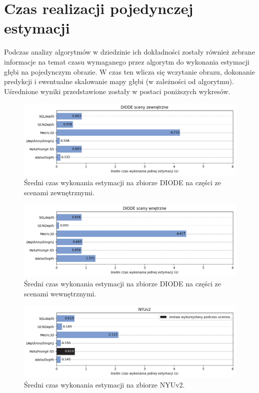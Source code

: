 \section{Czas realizacji pojedynczej estymacji}
Podczas analizy algorytmów w dziedzinie ich dokładności zostały również zebrane informacje na temat czasu wymaganego przez algorytm do wykonania estymacji głębi na pojedynczym obrazie. W czas ten wlicza się wczytanie obrazu, dokonanie predykcji i ewentualne skalowanie mapy głębi (w zależności od algorytmu). Uśrednione wyniki przedstawione zostały w postaci poniższych wykresów.
\begin{figure}[H]
    \centering
    \includegraphics{plots/exec_time/0}
    \caption{Średni czas wykonania estymacji na zbiorze DIODE na części ze scenami zewnętrznymi.}
    \label{fig:exec_time_0}
\end{figure}
\begin{figure}[H]
    \centering
    \includegraphics{plots/exec_time/1}
    \caption{Średni czas wykonania estymacji na zbiorze DIODE na części ze scenami wewnętrznymi.}
    \label{fig:exec_time_1}
\end{figure}
\begin{figure}[H]
    \centering
    \includegraphics{plots/exec_time/2}
    \caption{Średni czas wykonania estymacji na zbiorze NYUv2.}
    \label{fig:exec_time_2}
\end{figure}
